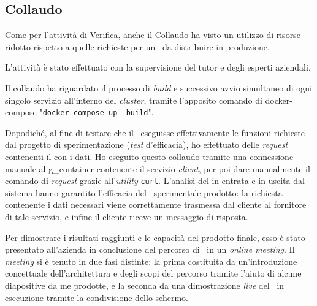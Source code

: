 \subsection{Collaudo}

Come per l'attività di Verifica, anche il Collaudo ha visto un utilizzo di risorse ridotto rispetto a quelle richieste per un \software\ da distribuire in produzione.

L'attività è stato effettuato con la supervisione del tutor e degli esperti aziendali.

Il collaudo ha riguardato il processo di \textit{build} e successivo avvio simultaneo di ogni singolo servizio all'interno del \textit{cluster}, tramite l'apposito comando di docker-compose "\texttt{docker-compose up --build}".

Dopodiché, al fine di testare che il \software\ eseguisse effettivamente le funzioni richieste dal progetto di sperimentazione (\textit{test} d'efficacia), ho effettuato delle   \textit{request} contenenti il  con i dati.
Ho eseguito questo collaudo tramite una connessione manuale al \gls{g_container} contenente il servizio  \textit{client}, per poi dare manualmente il comando di \textit{request} grazie all'\textit{utility} \texttt{curl}.
L'analisi del  in entrata e in uscita dal sistema hanno garantito l'efficacia del \software\ sperimentale prodotto: la richiesta contenente i dati necessari viene correttamente trasmessa dal cliente al fornitore di tale servizio, e infine il cliente riceve un messaggio di risposta.

Per dimostrare i risultati raggiunti e le capacità del prodotto finale, esso è stato presentato all'azienda in conclusione del percorso di \stage\ in un \textit{online meeting}.
Il \textit{meeting} si è tenuto in due fasi distinte: la prima costituita da un'introduzione concettuale dell'architettura e degli scopi del percorso tramite l'aiuto di alcune diapositive da me prodotte, e la seconda da una dimostrazione \textit{live} del \software\ in esecuzione tramite la condivisione dello schermo.


